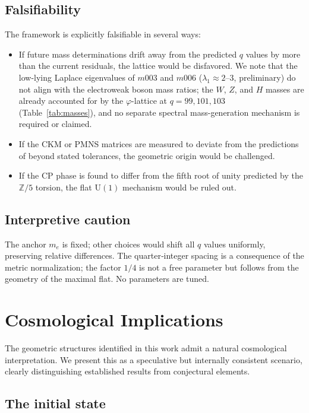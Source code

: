 \documentclass[12pt]{article}
\theoremstyle{definition}
\begin{document}
\subsection{Falsifiability}
The framework is explicitly falsifiable in several ways:
\begin{itemize}
\item If future mass determinations drift away from the predicted $q$ values by more than the current residuals, the lattice would be disfavored. We note that the low-lying Laplace eigenvalues of $m003$ and $m006$ ($\lambda_1 \approx 2$--$3$, preliminary) do not align with the electroweak boson mass ratios; the $W$, $Z$, and $H$ masses are already accounted for by the $\varphi$-lattice at $q=99,101,103$ (Table~\ref{tab:masses}), and no separate spectral mass-generation mechanism is required or claimed.
\item If the CKM or PMNS matrices are measured to deviate from the predictions of \cite{Gentry:CKM,Gentry:PMNS} beyond stated tolerances, the geometric origin would be challenged.
\item If the CP phase is found to differ from the fifth root of unity predicted by the $\mathbb{Z}/5$ torsion, the flat $\mathrm{U}(1)$ mechanism would be ruled out.
\end{itemize}

\subsection{Interpretive caution}
The anchor $m_e$ is fixed; other choices would shift all $q$ values uniformly, preserving relative differences. The quarter‑integer spacing is a consequence of the metric normalization; the factor $1/4$ is not a free parameter but follows from the geometry of the maximal flat. No parameters are tuned.

\section{Cosmological Implications}
\label{sec:cosmology}

The geometric structures identified in this work admit a natural
cosmological interpretation. We present this as a speculative but
internally consistent scenario, clearly distinguishing established
results from conjectural elements.

\subsection{The initial state}
\end{document}
